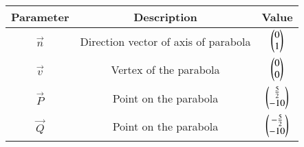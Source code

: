
\begin{center}
\begin{tabular}{|c|c|c|}
\hline
\textbf{Parameter}& \textbf{Description} &\textbf{Value}\\ \hline
$\vec{n}$		 &	Direction vector of axis of parabola&$\begin{pmatrix}0\\1\end{pmatrix}$\\ \hline
$\vec{v}$		 &	Vertex of the parabola&$\begin{pmatrix}0\\0\end{pmatrix}$\\ \hline
$\vec{P}$		 &  Point on the parabola&$\begin{pmatrix}\frac{5}{2}\\ -10\end{pmatrix}$ \\ \hline
$\vec{Q}$		 &  Point on the parabola&$\begin{pmatrix}-\frac{5}{2}\\ -10\end{pmatrix}$ \\ \hline
\end{tabular}
\end{center}
